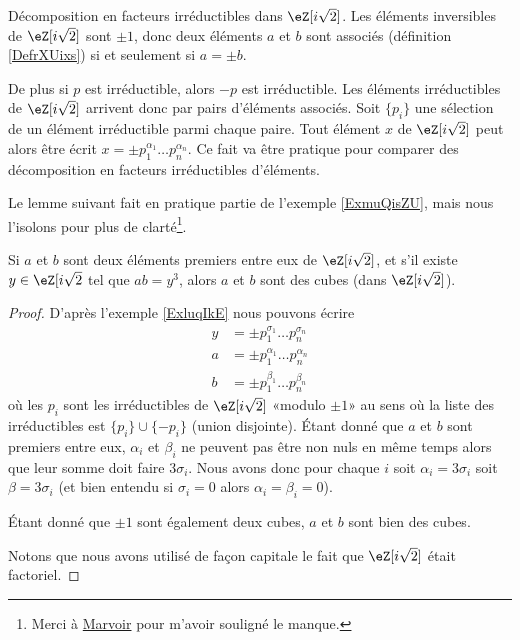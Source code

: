 \begin{example} \label{ExluqIkE}
    Décomposition en facteurs irréductibles dans \( \eZ[i\sqrt{2}]\). Les éléments inversibles de \( \eZ[i\sqrt{2}]\) sont \( \pm 1\), donc deux éléments \( a\) et \( b\) sont associés (définition \ref{DefrXUixs}) si et seulement si \( a=\pm b\).

    De plus si \( p\) est irréductible, alors \( -p\) est irréductible. Les éléments irréductibles de \( \eZ[i\sqrt{2}]\) arrivent donc par pairs d'éléments associés. Soit \( \{ p_i \}\) une sélection de un élément irréductible parmi chaque paire. Tout élément \( x\) de \( \eZ[i\sqrt{2}]\) peut alors être écrit \( x=\pm p_1^{\alpha_1}\ldots p_n^{\alpha_n}\). Ce fait va être pratique pour comparer des décomposition en facteurs irréductibles d'éléments.
\end{example}

Le lemme suivant fait en pratique partie de l'exemple \ref{ExmuQisZU}, mais nous l'isolons pour plus de clarté\footnote{Merci à \href{http://fr.wikipedia.org/wiki/Utilisateur:Marvoir}{Marvoir} pour m'avoir souligné le manque.}.
\begin{lemma}       \label{LemTScCIv}
    Si \( a\) et \( b\) sont deux éléments premiers entre eux de \( \eZ[i\sqrt{2}]\), et s'il existe \( y \in  \eZ[i\sqrt{2}\) tel que \( ab=y^3\), alors \( a\) et \( b\) sont des cubes (dans \( \eZ[i\sqrt{2}]\)).
\end{lemma}

\begin{proof}
    D'après l'exemple \ref{ExluqIkE} nous pouvons écrire
    \begin{subequations}
        \begin{align}
            y&=\pm p_1^{\sigma_1}\ldots p_n^{\sigma_n}\\
            a&=\pm p_1^{\alpha_1}\ldots p_n^{\alpha_n}\\
            b&=\pm p_1^{\beta_1}\ldots p_n^{\beta_n}
        \end{align}
    \end{subequations}
    où les \( p_i\) sont les irréductibles de \( \eZ[i\sqrt{2}]\) «modulo \( \pm 1\)» au sens où la liste des irréductibles est \( \{ p_i \}\cup\{ -p_i \}\) (union disjointe). Étant donné que \( a\) et \( b\) sont premiers entre eux, \( \alpha_i\) et \( \beta_i\) ne peuvent pas être non nuls en même temps alors que leur somme doit faire \( 3\sigma_i\). Nous avons donc pour chaque \( i\) soit \( \alpha_i=3\sigma_i\) soit \( \beta=3\sigma_i\) (et bien entendu si \( \sigma_i=0\) alors \( \alpha_i=\beta_i=0\)).

    Étant donné que \( \pm 1\) sont également deux cubes, \( a\) et \( b\) sont bien des cubes.

    Notons que nous avons utilisé de façon capitale le fait que \( \eZ[i\sqrt{2}]\) était factoriel.
\end{proof}

